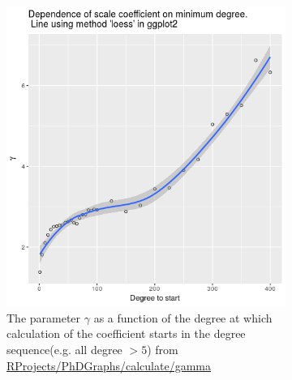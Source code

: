 

\begin{figure}
    \centering
    \begin{subfigure}[t]{0.45\textwidth}
        \centering
        \includegraphics[width=\linewidth]{images/dependence_of_scale_coefficient_on_min_degree.png} 
        \caption{The parameter $\gamma$ as a function of the degree at which calculation of the coefficient starts in the degree sequence(e.g. all degree $>5$) from \url{RProjects/PhDGraphs/calculate/gamma}} \label{fig:gamma}
    \end{subfigure}
    \hfill
    \begin{subfigure}[t]{0.45\textwidth}
        \centering

\end{subfigure}
\end{figure}

